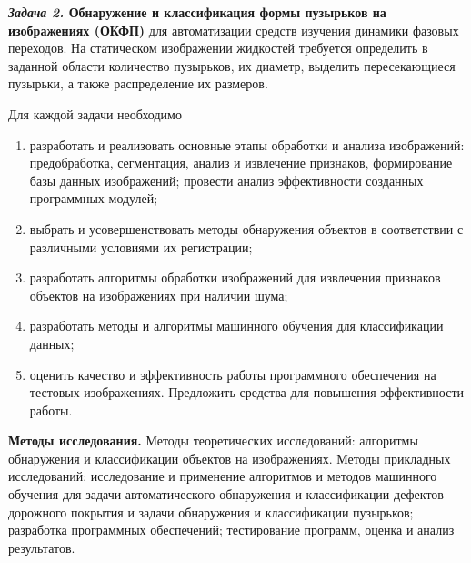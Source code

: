 \noindent\textbf{\textit{Задача 2.} Обнаружение и классификация формы пузырьков на изображениях (ОКФП)} для автоматизации средств изучения динамики фазовых переходов.  На статическом изображении жидкостей требуется определить в заданной области количество пузырьков, их диаметр, выделить пересекающиеся пузырьки, а также распределение их размеров.

Для каждой задачи необходимо
\begin{enumerate}
\item разработать и реализовать основные этапы обработки и анализа изображений: предобработка, сегментация, анализ и извлечение признаков, формирование базы данных изображений; провести анализ эффективности созданных программных модулей;
\item выбрать и усовершенствовать методы обнаружения объектов в соответствии с различными условиями их регистрации;
\item разработать алгоритмы обработки изображений для извлечения признаков объектов на изображениях при наличии шума;
\item разработать методы и алгоритмы машинного обучения для классификации данных;
\item оценить качество и эффективность работы программного обеспечения на тестовых изображениях. Предложить средства для повышения эффективности работы.
\end{enumerate}

\textbf{Методы исследования.} Методы теоретических исследований: алгоритмы обнаружения и классификации объектов на изображениях. Методы прикладных исследований: исследование и применение алгоритмов и методов машинного обучения для задачи автоматического обнаружения и классификации дефектов дорожного покрытия и задачи обнаружения и классификации пузырьков; разработка программных обеспечений; тестирование программ, оценка и анализ результатов.

